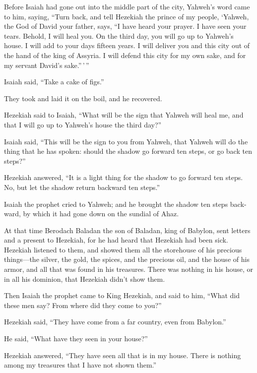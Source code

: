 \begin{paracol}{2}
\begin{otherlanguage}{english}
 Before Isaiah had gone out into the middle part of the
city, Yahweh's word came to him, saying,  ``Turn back, and
tell Hezekiah the prince of my people, `Yahweh, the God of David your
father, says, ``I have heard your prayer. I have seen your tears.
Behold, I will heal you. On the third day, you will go up to Yahweh's
house.  I will add to your days fifteen years. I will
deliver you and this city out of the hand of the king of Assyria. I will
defend this city for my own sake, and for my servant David's
sake.''\,'\,''

 Isaiah said, ``Take a cake of figs.''

They took and laid it on the boil, and he recovered.

 Hezekiah said to Isaiah, ``What will be the sign that
Yahweh will heal me, and that I will go up to Yahweh's house the third
day?''

 Isaiah said, ``This will be the sign to you from Yahweh,
that Yahweh will do the thing that he has spoken: should the shadow go
forward ten steps, or go back ten steps?''

 Hezekiah answered, ``It is a light thing for the shadow
to go forward ten steps. No, but let the shadow return backward ten
steps.''

 Isaiah the prophet cried to Yahweh; and he brought the
shadow ten steps backward, by which it had gone down on the sundial of
Ahaz.

 At that time Berodach Baladan the son of Baladan, king
of Babylon, sent letters and a present to Hezekiah, for he had heard
that Hezekiah had been sick.  Hezekiah listened to them,
and showed them all the storehouse of his precious things---the silver,
the gold, the spices, and the precious oil, and the house of his armor,
and all that was found in his treasures. There was nothing in his house,
or in all his dominion, that Hezekiah didn't show them.

 Then Isaiah the prophet came to King Hezekiah, and said
to him, ``What did these men say? From where did they come to you?''

Hezekiah said, ``They have come from a far country, even from Babylon.''

 He said, ``What have they seen in your house?''

Hezekiah answered, ``They have seen all that is in my house. There is
nothing among my treasures that I have not shown them.''


\end{otherlanguage}
\end{paracol}

